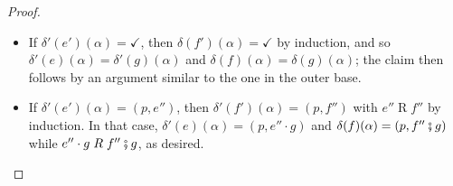 \documentclass[orivec,envcountsect,envcountsame]{llncs}
\begin{document}
\begin{proof}
\begin{itemize}
\begin{itemize}
			\item
			If $\delta'(e')(\alpha) = \checkmark$, then $\delta(f')(\alpha) = \checkmark$ by induction, and so $\delta'(e)(\alpha) = \delta'(g)(\alpha)$ and $\delta(f)(\alpha) = \delta(g)(\alpha)$; the claim then follows by an argument similar to the one in the outer base.

			\item
			If $\delta'(e')(\alpha) = (p, e'')$, then $\delta'(f')(\alpha) = (p, f'')$ with $e'' \mathrel{R} f''$ by induction.
			In that case, $\delta'(e)(\alpha) = (p, e'' \cdot g)$ and $\delta(f)(\alpha) = (p, f'' \fatsemi g)$ while $e'' \cdot g \mathrel{R} f'' \fatsemi g$, as desired.
		\end{itemize}
	\end{itemize}
\end{proof}
\end{document}
